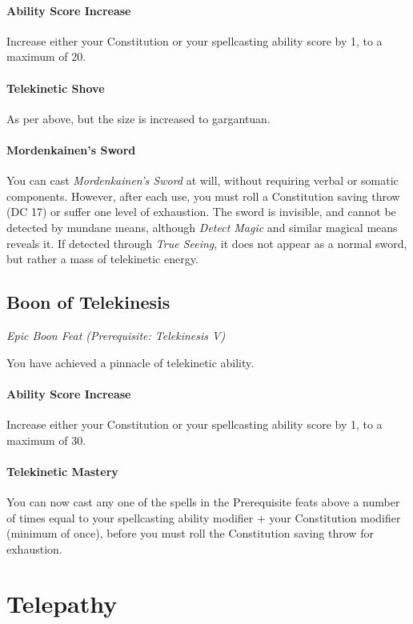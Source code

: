 \documentclass[twocolumn]{dndbook}
\begin{document}
\paragraph*{Ability Score Increase} Increase either your Constitution or your spellcasting ability score by 1, to a maximum of 20.
\paragraph*{Telekinetic Shove} As per above, but the size is increased to gargantuan.
\paragraph*{Mordenkainen's Sword} You can cast \emph{Mordenkainen's Sword} at will,
without requiring verbal or somatic components. However, after each use, you must roll a Constitution saving throw (DC 17) or suffer one level of exhaustion.
The sword is invisible, and cannot be detected by mundane means,
although \emph{Detect Magic} and similar magical means reveals it.
If detected through \emph{True Seeing}, it does not appear as a normal sword, but rather a mass of telekinetic energy.

\subsection{Boon of Telekinesis}
{\emph{Epic Boon Feat (Prerequisite: Telekinesis V)}}\par
You have achieved a pinnacle of telekinetic ability.
\paragraph*{Ability Score Increase} Increase either your Constitution or your spellcasting ability score by 1, to a maximum of 30.
\paragraph*{Telekinetic Mastery}
You can now cast any one of the spells in the Prerequisite feats above
a number of times equal to your spellcasting ability modifier + your Constitution modifier (minimum of once),
before you must roll the Constitution saving throw for exhaustion.



\section*{Telepathy}
\end{document}

